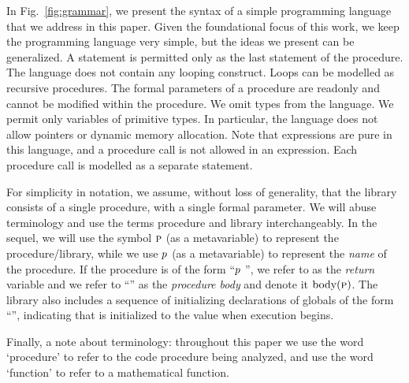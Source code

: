 In Fig.~\ref{fig:grammar}, we present the syntax of a simple
programming language that we address in this paper.
Given the foundational focus of this work, we keep the programming
language very simple, but the ideas we present can be generalized.
A  statement is permitted only as the last statement of
the procedure.
The language does not contain any looping construct.
Loops can be modelled as recursive procedures.
The formal parameters of a procedure are readonly and cannot be
modified within the procedure.
We omit types from the language. We permit only variables of primitive types.
In particular, the language does not allow pointers or dynamic memory allocation.
Note that expressions are pure in this language, and a procedure call
is not allowed in an expression. Each procedure call is modelled as a
separate statement.

For simplicity in notation, we assume, without loss of generality,
that the library consists of a single procedure, with a single formal
parameter. We will abuse terminology and use the terms procedure and library interchangeably.
In the sequel, we will use the symbol $\textsc{p}$ (as a metavariable) to represent the procedure/library,
while we use $p$ (as a metavariable) to represent the \emph{name} of the procedure.
If the procedure is of the form ``$p$ '', we refer to  as the \emph{return}
variable and we refer to ``'' as the \emph{procedure body} and denote it $\text{body}(\textsc{p})$.
The library also includes a sequence of initializing declarations of globals of the form ``'', indicating
that  is initialized to the value  when execution begins.

 Finally, a note about terminology: throughout this paper we
use the word `procedure' to refer to the code procedure being analyzed, and use the word
`function' to refer to a mathematical function.
